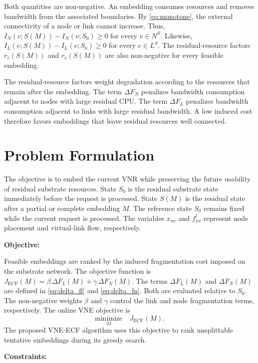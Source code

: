 \documentclass{ieeeaccess}
\newcommand{\ecfvne}{VNE-ECF}
\begin{document}
Both quantities are non-negative. An embedding consumes resources and removes bandwidth from the
associated boundaries. By \eqref{eq:monotone}, the external connectivity of a node or link cannot
increase. Thus, $I_N(v;S(M))-I_N(v;S_0)\ge0$ for every $v\in N^S$. Likewise,
$I_L(e;S(M))-I_L(e;S_0)\ge0$ for every $e\in L^S$. The residual-resource factors $r_v(S(M))$ and
$r_e(S(M))$ are also non-negative for every feasible embedding.

The residual-resource factors weight degradation according to the resources that remain after the
embedding. The term $\Delta F_N$ penalizes bandwidth consumption adjacent to nodes with large
residual CPU. The term $\Delta F_L$ penalizes bandwidth consumption adjacent to links with large
residual bandwidth. A low induced cost therefore favors embeddings that leave residual resources
well connected.


\section{Problem Formulation}
\label{sec:problem_formulation}

The objective is to embed the current VNR while preserving the future usability of residual
substrate resources. State $S_0$ is the residual substrate state immediately before the request is
processed. State $S(M)$ is the residual state after a partial or complete embedding $M$. The
reference state $S_0$ remains fixed while the current request is processed. The variables $x_{nv}$
and $f_{uv}^l$ represent node placement and virtual-link flow, respectively.

\textbf{Objective:}

Feasible embeddings are ranked by the induced fragmentation cost imposed on the substrate network.
The objective function is
$J_{\mathrm{ECF}}(M) = \beta\,\Delta F_L(M) + \gamma\,\Delta F_N(M)$.
The terms $\Delta F_L(M)$ and $\Delta F_N(M)$ are defined in \eqref{eq:delta_fl} and
\eqref{eq:delta_fn}. Both are evaluated relative to $S_0$. The non-negative weights $\beta$ and
$\gamma$ control the link and node fragmentation terms, respectively. The online VNE objective is
\begin{equation}
	\underset{M}{\text{minimize}}\quad J_{\mathrm{ECF}}(M).
	\label{eq:objective}
\end{equation}
The proposed \ecfvne{} algorithm uses this objective to rank unsplittable tentative embeddings
during its greedy search.

\textbf{Constraints:}
\end{document}
